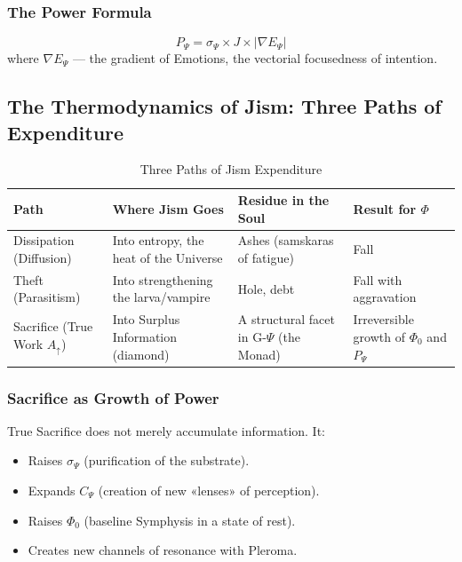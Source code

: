 \documentclass[a4paper,12pt]{article}
\begin{document}
	\subsubsection{The Power Formula}
	
	\[
	P_{\Psi} = \sigma_{\Psi} \times J \times |\nabla E_{\Psi}|
	\]
	where $\nabla E_{\Psi}$ — the gradient of Emotions, the vectorial focusedness of intention.
	
	\subsection{The Thermodynamics of Jism: Three Paths of Expenditure}
	
	\begin{table}[H]
		\centering
		\begin{tabular}{|p{3.5cm}|p{4.5cm}|p{3.5cm}|p{3.5cm}|}
			\hline
			\textbf{Path} & \textbf{Where Jism Goes} & \textbf{Residue in the Soul} & \textbf{Result for $\Phi$} \\
			\hline
			Dissipation (Diffusion) & Into entropy, the heat of the Universe & Ashes (samskaras of fatigue) & Fall \\
			\hline
			Theft (Parasitism) & Into strengthening the larva/vampire & Hole, debt & Fall with aggravation \\
			\hline
			Sacrifice (True Work $A_{\uparrow}$) & Into Surplus Information (diamond) & A structural facet in G-$\Psi$ (the Monad) & Irreversible growth of $\Phi_0$ and $P_{\Psi}$ \\
			\hline
		\end{tabular}
		\caption{Three Paths of Jism Expenditure}
	\end{table}
	
	\subsubsection{Sacrifice as Growth of Power}
	
	True Sacrifice does not merely accumulate information. It:
	\begin{itemize}
		\item Raises $\sigma_{\Psi}$ (purification of the substrate).
		\item Expands $C_{\Psi}$ (creation of new «lenses» of perception).
		\item Raises $\Phi_0$ (baseline Symphysis in a state of rest).
		\item Creates new channels of resonance with Pleroma.
	\end{itemize}
	
\end{document}
